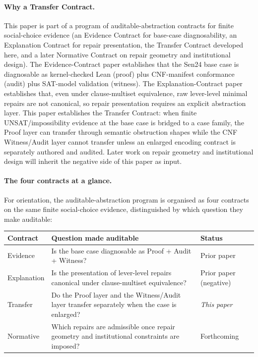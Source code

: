 \paragraph{Why a Transfer Contract.}
This paper is part of a program of auditable-abstraction contracts for finite social-choice evidence (an Evidence Contract for base-case diagnosability, an Explanation Contract for repair presentation, the Transfer Contract developed here, and a later Normative Contract on repair geometry and institutional design).
The Evidence-Contract paper establishes that the Sen24 base case is diagnosable as kernel-checked Lean (proof) plus CNF-manifest conformance (audit) plus SAT-model validation (witness).
The Explanation-Contract paper establishes that, even under clause-multiset equivalence, raw lever-level minimal repairs are not canonical, so repair presentation requires an explicit abstraction layer.
This paper establishes the Transfer Contract: when finite UNSAT/impossibility evidence at the base case is bridged to a case family, the Proof layer can transfer through semantic obstruction shapes while the CNF Witness/Audit layer cannot transfer unless an enlarged encoding contract is separately authored and audited.
Later work on repair geometry and institutional design will inherit the negative side of this paper as input.

\paragraph{The four contracts at a glance.}
For orientation, the auditable-abstraction program is organised as four contracts on the same finite social-choice evidence, distinguished by which question they make auditable:

\begingroup
\renewcommand{\arraystretch}{1.2}
\noindent\begin{tabularx}{\linewidth}{@{}l X l@{}}
\toprule
Contract & Question made auditable & Status \\
\midrule
Evidence    & Is the base case diagnosable as Proof + Audit + Witness?                                      & Prior paper            \\
Explanation & Is the presentation of lever-level repairs canonical under clause-multiset equivalence?       & Prior paper (negative) \\
Transfer    & Do the Proof layer and the Witness/Audit layer transfer separately when the case is enlarged? & \emph{This paper}      \\
Normative   & Which repairs are admissible once repair geometry and institutional constraints are imposed?  & Forthcoming            \\
\bottomrule
\end{tabularx}
\endgroup

